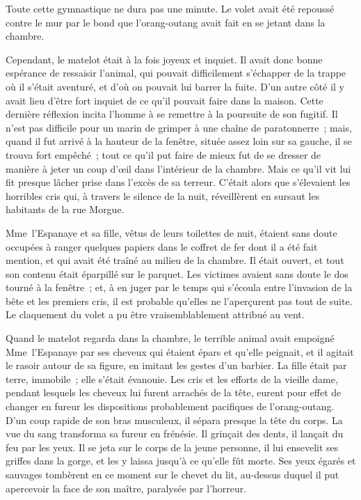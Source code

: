 \documentclass[french,twoside]{book} %
\begin{document}
Toute cette gymnastique ne dura pas une minute. Le volet avait été repoussé contre le mur par le bond que l’orang-outang avait fait en se jetant dans la chambre.\par
Cependant, le matelot était à la fois joyeux et inquiet. Il avait donc bonne espérance de ressaisir l’animal, qui pouvait difficilement s’échapper de la trappe où il s’était aventuré, et d’où on pouvait lui barrer la fuite. D’un autre côté il y avait lieu d’être fort inquiet de ce qu’il pouvait faire dans la maison. Cette dernière réflexion incita l’homme à se remettre à la poursuite de son fugitif. Il n’est pas difficile pour un marin de grimper à une chaîne de paratonnerre ; mais, quand il fut arrivé à la hauteur de la fenêtre, située assez loin sur sa gauche, il se trouva fort empêché ; tout ce qu’il put faire de mieux fut de se dresser de manière à jeter un coup d’œil dans l’intérieur de la chambre. Mais ce qu’il vit lui fit presque lâcher prise dans l’excès de sa terreur. C’était alors que s’élevaient les horribles cris qui, à travers le silence de la nuit, réveillèrent en sursaut les habitants de la rue Morgue.\par
Mme l’Espanaye et sa fille, vêtus de leurs toilettes de nuit, étaient sans doute occupées à ranger quelques papiers dans le coffret de fer dont il a été fait mention, et qui avait été traîné au milieu de la chambre. Il était ouvert, et tout son contenu était éparpillé sur le parquet. Les victimes avaient sans doute le dos tourné à la fenêtre ; et, à en juger par le temps qui s’écoula entre l’invasion de la bête et les premiers cris, il est probable qu’elles ne l’aperçurent pas tout de suite. Le claquement du volet a pu être vraisemblablement attribué au vent.\par
Quand le matelot regarda dans la chambre, le terrible animal avait empoigné Mme l’Espanaye par ses cheveux qui étaient épars et qu’elle peignait, et il agitait le rasoir autour de sa figure, en imitant les gestes d’un barbier. La fille était par terre, immobile ; elle s’était évanouie. Les cris et les efforts de la vieille dame, pendant lesquels les cheveux lui furent arrachés de la tête, eurent pour effet de changer en fureur les dispositions probablement pacifiques de l’orang-outang. D’un coup rapide de son bras musculeux, il sépara presque la tête du corps. La vue du sang transforma sa fureur en frénésie. Il grinçait des dents, il lançait du feu par les yeux. Il se jeta sur le corps de la jeune personne, il lui ensevelit ses griffes dans la gorge, et les y laissa jusqu’à ce qu’elle fût morte. Ses yeux égarés et sauvages tombèrent en ce moment sur le chevet du lit, au-dessus duquel il put apercevoir la face de son maître, paralysée par l’horreur.\par
\end{document}
